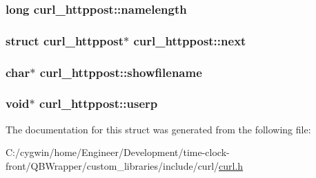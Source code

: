 \subsubsection[{namelength}]{\setlength{\rightskip}{0pt plus 5cm}long curl\+\_\+httppost\+::namelength}\label{structcurl__httppost_aaabe46ae54c1b46510d704f71bcfc041}
\hypertarget{structcurl__httppost_a09be6ec2bb379d4580f5022be3fa65d7}{}
\subsubsection[{next}]{\setlength{\rightskip}{0pt plus 5cm}struct {\bf curl\+\_\+httppost}$\ast$ curl\+\_\+httppost\+::next}\label{structcurl__httppost_a09be6ec2bb379d4580f5022be3fa65d7}
\hypertarget{structcurl__httppost_a84945dbb6cf774682227cfaab2ba7e01}{}
\subsubsection[{showfilename}]{\setlength{\rightskip}{0pt plus 5cm}char$\ast$ curl\+\_\+httppost\+::showfilename}\label{structcurl__httppost_a84945dbb6cf774682227cfaab2ba7e01}
\hypertarget{structcurl__httppost_ad2e5d00f8c4c6c536860599701c69694}{}
\subsubsection[{userp}]{\setlength{\rightskip}{0pt plus 5cm}void$\ast$ curl\+\_\+httppost\+::userp}\label{structcurl__httppost_ad2e5d00f8c4c6c536860599701c69694}


The documentation for this struct was generated from the following file\+:\begin{DoxyCompactItemize}
\item 
C\+:/cygwin/home/\+Engineer/\+Development/time-\/clock-\/front/\+Q\+B\+Wrapper/custom\+\_\+libraries/include/curl/\hyperlink{curl_8h}{curl.\+h}\end{DoxyCompactItemize}
